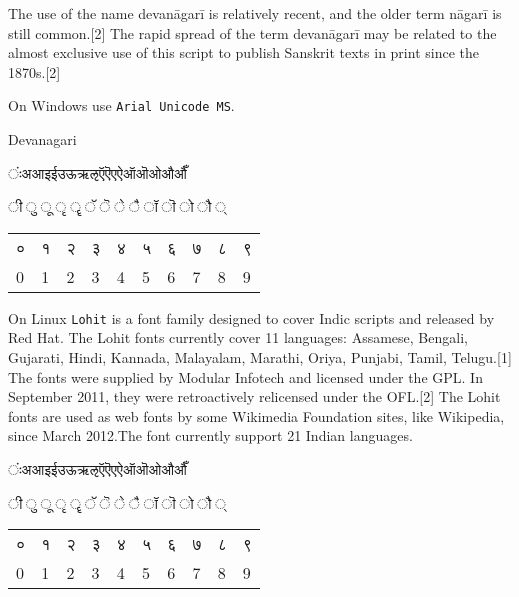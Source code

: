 The use of the name devanāgarī is relatively recent, and the older term nāgarī is still common.[2] The rapid spread of the term devanāgarī may be related to the almost exclusive use of this script to publish Sanskrit texts in print since the 1870s.[2]

On Windows use \texttt{Arial Unicode MS}. 
\medskip

\newfontfamily{}

\begin{scriptexample}[]{Devanagari}
{\begin{center}\parindent0pt\devanagari

ंःअआइईउऊऋऌऍऎएऐऑऒओऔऔँ \par 

ी	ु	ू	ृ	ॄ	ॅ	ॆ	े	ै	ॉ	ॊ	ो	ौ	्	\par

\bigskip		
\begin{tabular}{lll lll lll l}
०	&१	&२	&३	&४	&५	&६	&७	&८	&९\\
0	&1	&2	&3	&4	&5	&6	&7	&8	&9\\
\end{tabular}
\end{center}	
}
\end{scriptexample}


On Linux \texttt{Lohit} is a font family designed to cover Indic scripts and released by Red Hat. The Lohit fonts currently cover 11 languages: Assamese, Bengali, Gujarati, Hindi, Kannada, Malayalam, Marathi, Oriya, Punjabi, Tamil, Telugu.[1] The fonts were supplied by Modular Infotech and licensed under the GPL. In September 2011, they were retroactively relicensed under the OFL.[2] The Lohit fonts are used as web fonts by some Wikimedia Foundation sites, like Wikipedia, since March 2012.The font currently support 21 Indian languages. 
{
\newfontfamily{}

\begin{center}\parindent0pt\devanagarilohit

ंःअआइईउऊऋऌऍऎएऐऑऒओऔऔँ \par 

ी	ु	ू	ृ	ॄ	ॅ	ॆ	े	ै	ॉ	ॊ	ो	ौ	्	\par

\bigskip		
\begin{tabular}{lll lll lll l}
०	&१	&२	&३	&४	&५	&६	&७	&८	&९\\
0	&1	&2	&3	&4	&5	&6	&7	&8	&9\\
\end{tabular}
\end{center}

}
